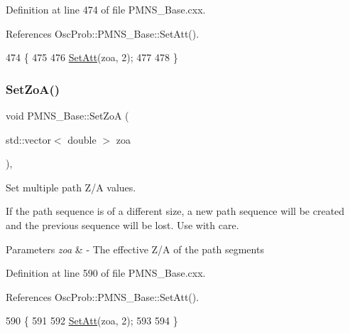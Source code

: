 Definition at line 474 of file P\+M\+N\+S\+\_\+\+Base.\+cxx.



References Osc\+Prob\+::\+P\+M\+N\+S\+\_\+\+Base\+::\+Set\+Att().


\begin{DoxyCode}
474                                 \{
475 
476   \hyperlink{classOscProb_1_1PMNS__Base_aba565962a440d14bee7a2a96d2eca2c5}{SetAtt}(zoa, 2);
477 
478 \}
\end{DoxyCode}
\mbox{\label{classOscProb_1_1PMNS__Base_a8495f8a320e1a21965e6a64aec92ad2a}} 
\subsubsection{\texorpdfstring{Set\+Zo\+A()}{SetZoA()}\hspace{0.1cm}{\footnotesize\ttfamily [2/2]}}
{\footnotesize\ttfamily void P\+M\+N\+S\+\_\+\+Base\+::\+Set\+ZoA (\begin{DoxyParamCaption}\item[{std\+::vector$<$ double $>$}]{zoa }\end{DoxyParamCaption})\hspace{0.3cm}{\ttfamily [virtual]}, {\ttfamily [inherited]}}

Set multiple path Z/A values.

If the path sequence is of a different size, a new path sequence will be created and the previous sequence will be lost. Use with care.


\begin{DoxyParams}{Parameters}
{\em zoa} & -\/ The effective Z/A of the path segments \\
\hline
\end{DoxyParams}


Definition at line 590 of file P\+M\+N\+S\+\_\+\+Base.\+cxx.



References Osc\+Prob\+::\+P\+M\+N\+S\+\_\+\+Base\+::\+Set\+Att().


\begin{DoxyCode}
590                                            \{
591 
592   \hyperlink{classOscProb_1_1PMNS__Base_aba565962a440d14bee7a2a96d2eca2c5}{SetAtt}(zoa, 2);
593 
594 \}
\end{DoxyCode}
\mbox{\label{classOscProb_1_1PMNS__Fast_a8a0828401591e88c60e0051fbfe02d5e}} 
